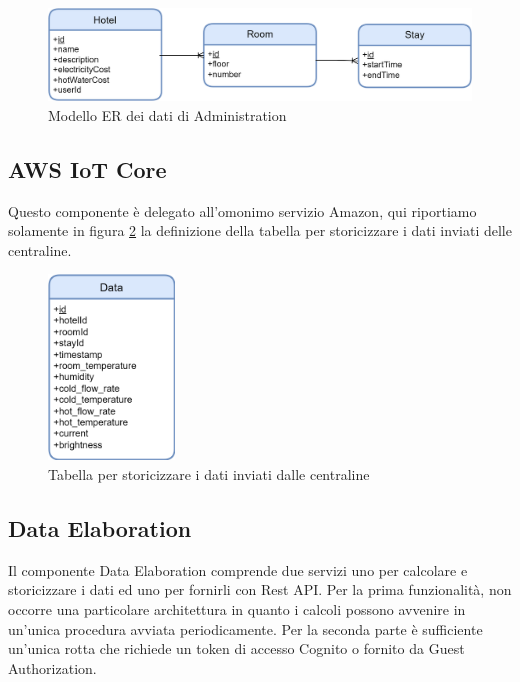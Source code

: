 \begin{figure}[H]
    \begin{center}
        \includegraphics[width=1.0\textwidth]{images/er-admin.png}
    \end{center}
    \caption{\label{er-admin}Modello ER dei dati di Administration}
\end{figure}

\subsection{AWS IoT Core}

Questo componente è delegato all'omonimo servizio Amazon, 
qui riportiamo solamente in figura \ref*{er-iot} la definizione della tabella per storicizzare i dati inviati delle centraline.

\begin{figure}[H]
    \begin{center}
        \includegraphics[width=0.3\textwidth]{images/er-iot.png}
    \end{center}
    \caption{\label{er-iot} Tabella per storicizzare i dati inviati dalle centraline}
\end{figure}


\subsection{Data Elaboration}

Il componente Data Elaboration comprende due servizi uno per calcolare e storicizzare i dati ed uno per fornirli con Rest API.
Per la prima funzionalità, non occorre una particolare architettura in quanto i calcoli possono avvenire in un'unica procedura avviata periodicamente.
Per la seconda parte è sufficiente un'unica rotta che richiede un token di accesso Cognito o fornito da Guest Authorization.

